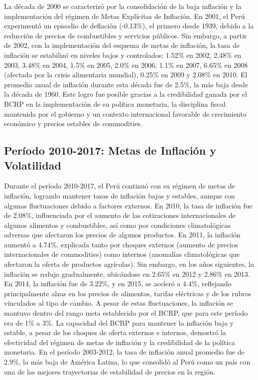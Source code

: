 \documentclass[
  stu,
  floatsintext,
  longtable,
  a4paper,
  nolmodern,
  notxfonts,
  notimes,
  12pt,
  colorlinks=true,linkcolor=blue,citecolor=blue,urlcolor=blue]{apa7}
\begin{document}
La década de 2000 se caracterizó por la consolidación de la baja
inflación y la implementación del régimen de Metas Explícitas de
Inflación. En 2001, el Perú experimentó un episodio de deflación
(-0.13\%), el primero desde 1939, debido a la reducción de precios de
combustibles y servicios públicos. Sin embargo, a partir de 2002, con la
implementación del esquema de metas de inflación, la tasa de inflación
se estabilizó en niveles bajos y controlados: 1.52\% en 2002, 2.48\% en
2003, 3.48\% en 2004, 1.5\% en 2005, 2.0\% en 2006, 1.1\% en 2007,
6.65\% en 2008 (afectada por la crisis alimentaria mundial), 0.25\% en
2009 y 2.08\% en 2010. El promedio anual de inflación durante esta
década fue de 2.5\%, la más baja desde la década de 1960. Este logro fue
posible gracias a la credibilidad ganada por el BCRP en la
implementación de su política monetaria, la disciplina fiscal mantenida
por el gobierno y un contexto internacional favorable de crecimiento
económico y precios estables de commodities.

\subsection{Período 2010-2017: Metas de Inflación y
Volatilidad}\label{peruxedodo-2010-2017-metas-de-inflaciuxf3n-y-volatilidad}

Durante el período 2010-2017, el Perú continuó con su régimen de metas
de inflación, logrando mantener tasas de inflación bajas y estables,
aunque con algunas fluctuaciones debido a factores externos. En 2010, la
tasa de inflación fue de 2.08\%, influenciada por el aumento de las
cotizaciones internacionales de algunos alimentos y combustibles, así
como por condiciones climatológicas adversas que afectaron los precios
de algunos productos. En 2011, la inflación aumentó a 4.74\%, explicada
tanto por choques externos (aumento de precios internacionales de
commodities) como internos (anomalías climatológicas que afectaron la
oferta de productos agrícolas). Sin embargo, en los años siguientes, la
inflación se redujo gradualmente, ubicándose en 2.65\% en 2012 y 2.86\%
en 2013. En 2014, la inflación fue de 3.22\%, y en 2015, se aceleró a
4.4\%, reflejando principalmente alzas en los precios de alimentos,
tarifas eléctricas y de los rubros vinculados al tipo de cambio. A pesar
de estas fluctuaciones, la inflación se mantuvo dentro del rango meta
establecido por el BCRP, que para este período era de 1\% a 3\%. La
capacidad del BCRP para mantener la inflación baja y estable, a pesar de
los choques de oferta externos e internos, demostró la efectividad del
régimen de metas de inflación y la credibilidad de la política
monetaria. En el período 2003-2012, la tasa de inflación anual promedio
fue de 2.9\%, la más baja de América Latina, lo que consolidó al Perú
como un país con una de las mejores trayectorias de estabilidad de
precios en la región.
\end{document}
